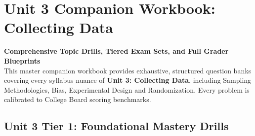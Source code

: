 \chapter{Unit 3 Companion Workbook: Collecting Data}
\label{chap:companion_unit_3}
{\large\bfseries\color{MidnightBlue} Comprehensive Topic Drills, Tiered Exam Sets, and Full Grader Blueprints}\\[8pt]
This master companion workbook provides exhaustive, structured question banks covering every syllabus nuance of \textbf{Unit 3: Collecting Data}, including Sampling Methodologies, Bias, Experimental Design and Randomization. Every problem is calibrated to College Board scoring benchmarks.\\[12pt]
\section{Unit 3 Tier 1: Foundational Mastery Drills}
